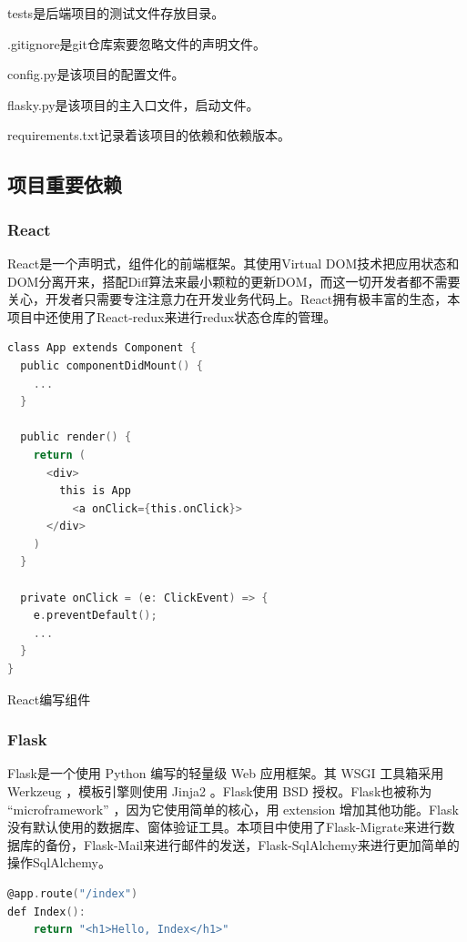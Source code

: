 tests是后端项目的测试文件存放目录。

.gitignore是git仓库索要忽略文件的声明文件。

config.py是该项目的配置文件。

flasky.py是该项目的主入口文件，启动文件。

requirements.txt记录着该项目的依赖和依赖版本。

\subsection{项目重要依赖}

\subsubsection{React}

React是一个声明式，组件化的前端框架。其使用Virtual DOM技术把应用状态和DOM分离开来，搭配Diff算法来最小颗粒的更新DOM，而这一切开发者都不需要关心，开发者只需要专注注意力在开发业务代码上。React拥有极丰富的生态，本项目中还使用了React-redux来进行redux状态仓库的管理。

\begin{lstlisting}[language=C]
class App extends Component {
  public componentDidMount() {
  	...
  }
  
  public render() {
	return (
	  <div>
	    this is App
	      <a onClick={this.onClick}>
	  </div>
	)
  }
	  
  private onClick = (e: ClickEvent) => {
    e.preventDefault();
    ...
  }
}
\end{lstlisting}

\begin{center}
	{\small React编写组件}
\end{center}

\subsubsection{Flask}

Flask是一个使用 Python 编写的轻量级 Web 应用框架。其 WSGI 工具箱采用 Werkzeug ，模板引擎则使用 Jinja2 。Flask使用 BSD 授权。Flask也被称为 “microframework” ，因为它使用简单的核心，用 extension 增加其他功能。Flask没有默认使用的数据库、窗体验证工具。本项目中使用了Flask-Migrate来进行数据库的备份，Flask-Mail来进行邮件的发送，Flask-SqlAlchemy来进行更加简单的操作SqlAlchemy。

\begin{lstlisting}[language=C]
@app.route("/index")
def Index():
	return "<h1>Hello, Index</h1>"
\end{lstlisting}

